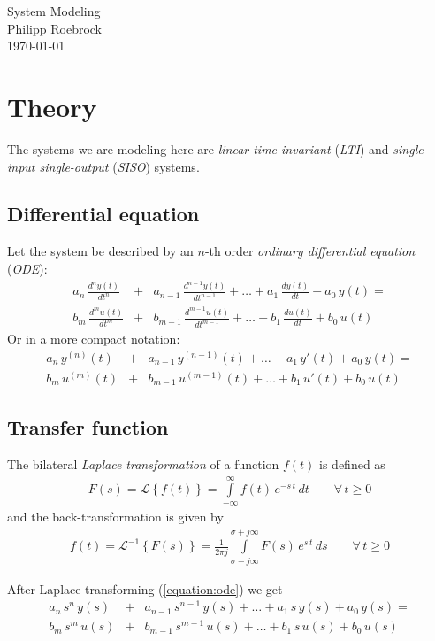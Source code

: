 \documentclass[a4paper,12pt]{article}
\newcommand{\Section}[2]{\section{#2}\label{section:#1}}
\newcommand{\SubSection}[2]{\subsection{#2}\label{subsection:#1}}
\newcommand{\ELabel}[1]{\label{equation:#1}}
\newcommand{\ERef}[1]{(\ref{equation:#1})}
\begin{document}
\vspace{1.5cm}
\begin{center}
{\Huge System Modeling}\\[3ex]
Philipp Roebrock\\[1ex]
\today\\
\end{center}
\vspace{1cm}






\Section{theory}{Theory}

The systems we are modeling here are {\em linear time-invariant} ({\em LTI}) and
{\em single-input single-output} ({\em SISO}) systems.

\SubSection{diffeq}{Differential equation}

Let the system be described by an $n$-th order {\em ordinary differential
equation} ({\em ODE}):
\begin{eqnarray}
a_{n}\,\frac{d^{n}y(t)}{dt^{n}}&+&a_{n-1}\,\frac{d^{n-1}y(t)}{dt^{n-1}}+\ldots+a_{1}\,\frac{dy(t)}{dt}+a_{0}\,y(t)=\nonumber\\
b_{m}\,\frac{d^{m}u(t)}{dt^{m}}&+&b_{m-1}\,\frac{d^{m-1}u(t)}{dt^{m-1}}+\ldots+b_{1}\,\frac{du(t)}{dt}+b_{0}\,u(t)
\end{eqnarray}
Or in a more compact notation:
\begin{eqnarray}
\ELabel{ode}
a_{n}\,y^{(n)}(t)&+&a_{n-1}\,y^{(n-1)}(t)+\ldots+a_{1}\,y'(t)+a_{0}\,y(t)=\nonumber\\
b_{m}\,u^{(m)}(t)&+&b_{m-1}\,u^{(m-1)}(t)+\ldots+b_{1}\,u'(t)+b_{0}\,u(t)
\end{eqnarray}

\SubSection{xferfunc}{Transfer function}

The bilateral {\em Laplace transformation} of a function $f(t)$ is defined as
\begin{eqnarray}
F(s)=\mathcal{L}\left\{f(t)\right\}=\int\limits_{-\infty}^{\infty}f(t)\,e^{-s\,t}\,dt\qquad\forall\,t\geq0
\end{eqnarray}
and the back-transformation is given by
\begin{eqnarray}
f(t)=\mathcal{L}^{-1}\left\{F(s)\right\}=\frac{1}{2\pi j}\int\limits_{\sigma-j\infty}^{\sigma+j\infty}F(s)\,e^{s\,t}\,ds\qquad\forall\,t\geq0
\end{eqnarray}

After Laplace-transforming \ERef{ode} we get
\begin{eqnarray}
\ELabel{xfer}
a_{n}\,s^{n}\,y(s)&+&a_{n-1}\,s^{n-1}\,y(s)+\ldots+a_{1}\,s\,y(s)+a_{0}\,y(s)=\nonumber\\
b_{m}\,s^{m}\,u(s)&+&b_{m-1}\,s^{m-1}\,u(s)+\ldots+b_{1}\,s\,u(s)+b_{0}\,u(s)
\end{eqnarray}
\end{document}
